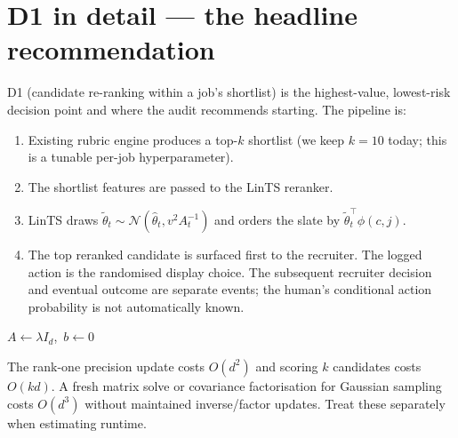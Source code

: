 \documentclass[11pt,oneside]{scrbook}
\begin{document}
\section{D1 in detail --- the headline recommendation}

D1 (candidate re-ranking within a job's shortlist) is the highest-value,
lowest-risk decision point and where the audit recommends starting. The
pipeline is:

\begin{enumerate}
  \item Existing rubric engine produces a top-$k$ shortlist (we keep
        $k = 10$ today; this is a tunable per-job hyperparameter).
  \item The shortlist features are passed to the LinTS reranker.
  \item LinTS draws $\tilde\theta_t \sim \mathcal{N}(\hat\theta_t,
        v^2 A_t^{-1})$ and orders the slate by $\tilde\theta_t^\top
        \phi(c, j)$.
  \item The top reranked candidate is surfaced first to the recruiter.
        The logged action is the randomised display choice. The subsequent recruiter decision and eventual outcome are separate events; the human's conditional action probability is not automatically known.
\end{enumerate}

\begin{algorithm}[H]
\DontPrintSemicolon
\caption{LinTS reranker on top of the synthetic ATS rubric engine.}
$A \gets \lambda I_d$, $\,b \gets 0$\;
\end{algorithm}

The rank-one precision update costs $O(d^2)$ and scoring $k$ candidates
costs $O(kd)$. A fresh matrix solve or covariance factorisation for Gaussian
sampling costs $O(d^3)$ without maintained inverse/factor updates. Treat
these separately when estimating runtime.
\end{document}
